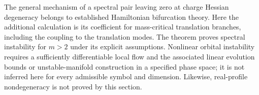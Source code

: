 \begin{remark}
The general mechanism of a spectral pair leaving zero at charge
Hessian degeneracy belongs to established Hamiltonian bifurcation
theory. Here the additional calculation is its coefficient for
mass-critical translation branches, including the coupling to the
translation modes. The theorem proves spectral instability for
$m>2$ under its explicit assumptions. Nonlinear orbital instability
requires a sufficiently differentiable local flow and the associated
linear evolution bounds or unstable-manifold construction in a
specified phase space; it is not inferred here for every admissible
symbol and dimension. Likewise, real-profile nondegeneracy is not
proved by this section.
\end{remark}
